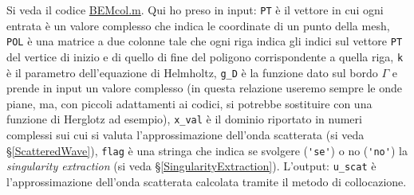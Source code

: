 Si veda il codice \href{https://github.com/Daldossi/BEM/blob/main/BEM_col.m}{BEMcol.m}.
Qui ho preso in input: \verb|PT| è il vettore in cui ogni entrata è un valore complesso che indica le coordinate di un punto della mesh, \verb|POL| è una matrice a due colonne tale che ogni riga indica gli indici sul vettore \verb|PT| del vertice di inizio e di quello di fine del poligono corrispondente a quella riga, \verb|k| è il parametro dell'equazione di Helmholtz, \verb|g_D| è la funzione dato sul bordo $\Gamma$ e prende in input un valore complesso (in questa relazione useremo sempre le onde piane, ma, con piccoli adattamenti ai codici, si potrebbe sostituire con una funzione di Herglotz ad esempio), \verb|x_val| è il dominio riportato in numeri complessi sui cui si valuta l'approssimazione dell'onda scatterata (si veda \S \ref{ScatteredWave}), \verb|flag| è una stringa che indica se svolgere (\verb|'se'|) o no (\verb|'no'|) la \textit{singularity extraction} (si veda \S \ref{SingularityExtraction}). L'output: \verb|u_scat| è l'approssimazione dell'onda scatterata calcolata tramite il metodo di collocazione.


